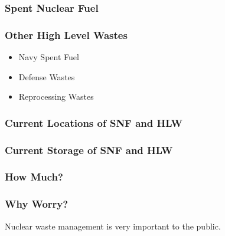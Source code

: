 
\begin{frame}[ctb!]
  \frametitle{Spent Nuclear Fuel}
  
\end{frame}

\begin{frame}[ctb!]
  \frametitle{Other High Level Wastes}
  \begin{itemize}
    \item Navy Spent Fuel
    \item Defense Wastes
    \item Reprocessing Wastes
  \end{itemize}
\end{frame}

\begin{frame}[ctb!]
  \frametitle{Current Locations of SNF and HLW}
  
\end{frame}

\begin{frame}[ctb!]
  \frametitle{Current Storage of SNF and HLW}
  
\end{frame}

\begin{frame}[ctb!]
  \frametitle{How Much?}
  
\end{frame}

\begin{frame}[ctb!]
  \frametitle{Why Worry?}
  Nuclear waste management is very important to the public.
  
\end{frame}

